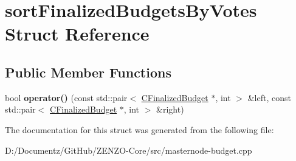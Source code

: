 \hypertarget{structsort_finalized_budgets_by_votes}{}\section{sort\+Finalized\+Budgets\+By\+Votes Struct Reference}
\label{structsort_finalized_budgets_by_votes}
\subsection*{Public Member Functions}
\begin{DoxyCompactItemize}
\item 
\mbox{\label{structsort_finalized_budgets_by_votes_afa884d1bbbe58624c6d3ff0e42e721eb}} 
bool {\bfseries operator()} (const std\+::pair$<$ \mbox{\hyperlink{class_c_finalized_budget}{C\+Finalized\+Budget}} $\ast$, int $>$ \&left, const std\+::pair$<$ \mbox{\hyperlink{class_c_finalized_budget}{C\+Finalized\+Budget}} $\ast$, int $>$ \&right)
\end{DoxyCompactItemize}


The documentation for this struct was generated from the following file\+:\begin{DoxyCompactItemize}
\item 
D\+:/\+Documentz/\+Git\+Hub/\+Z\+E\+N\+Z\+O-\/\+Core/src/masternode-\/budget.\+cpp\end{DoxyCompactItemize}
